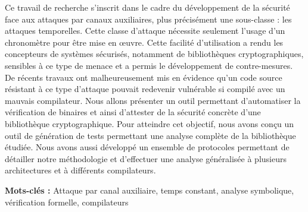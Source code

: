 Ce travail de recherche s'inscrit dans le cadre du développement de la sécurité face aux attaques par canaux auxiliaires, plus précisément une sous-classe : les attaques temporelles. Cette classe d'attaque nécessite seulement l'usage d'un chronomètre pour être mise en œuvre. Cette facilité d'utilisation a rendu les concepteurs de systèmes sécurisés, notamment de bibliothèques cryptographiques, sensibles à ce type de menace et a permis le développement de contre-mesures. De récents travaux ont malheureusement mis en évidence qu'un code source résistant à ce type d'attaque pouvait redevenir vulnérable si compilé avec un mauvais compilateur. Nous allons présenter un outil permettant d'automatiser la vérification de binaires et ainsi d'attester de la sécurité concrète d'une bibliothèque cryptographique. Pour atteindre cet objectif, nous avons conçu un outil de génération de tests permettant une analyse complète de la bibliothèque étudiée. Nous avons aussi développé un ensemble de protocoles permettant de détailler notre méthodologie et d'effectuer une analyse généralisée à plusieurs architectures et à différents compilateurs.

\bigbreak

\textbf{Mots-clés :} Attaque par canal auxiliaire, temps constant, analyse symbolique, vérification formelle, compilateurs
